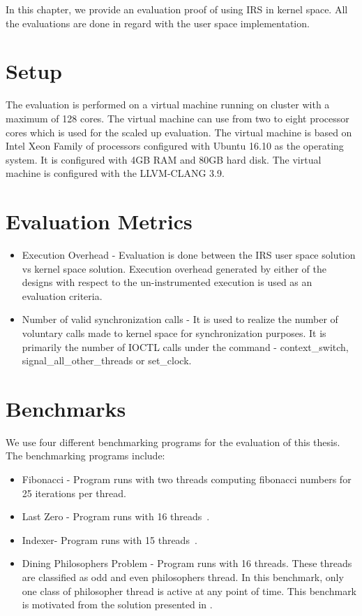 In this chapter, we provide an evaluation proof of using IRS in kernel space. 
All the evaluations are done in regard with the user space implementation. 

\section{Setup}

The evaluation is performed on a virtual machine running on cluster with a maximum of 128 cores. 
The virtual machine can use from two to eight processor cores which is used for the scaled up evaluation. 
The virtual machine is based on Intel Xeon Family of processors configured with Ubuntu 16.10 as the operating system. 
It is configured with 4GB RAM and 80GB hard disk. 
The virtual machine is configured with the LLVM-CLANG 3.9.


\section{Evaluation Metrics}

\begin{itemize}
\item{Execution Overhead} - Evaluation is done between the IRS user space solution vs kernel space solution. 
Execution overhead generated by either of the designs with respect to the un-instrumented execution is used as an evaluation criteria.
\item{Number of valid synchronization calls} - It is used to realize the number of voluntary calls made to kernel space for synchronization purposes. 
It is primarily the number of IOCTL calls under the command - context\_switch, signal\_all\_other\_threads or set\_clock.
\end{itemize}


\section{Benchmarks}

We use four different benchmarking programs for the evaluation of this thesis. 
The benchmarking programs include:
\begin{itemize}
\item{Fibonacci} - Program runs with two threads computing fibonacci numbers for 25 iterations per thread.
\item{Last Zero} - Program runs with 16 threads~\citep{abdulla2014optimal}.
\item{Indexer}- Program runs with 15 threads~\citep{dynamic_por}.
\item{Dining Philosophers Problem} - Program runs with 16 threads. These threads are classified as odd and even philosophers thread. 
In this benchmark, only one class of philosopher thread is active at any point of time. 
This benchmark is motivated from the solution presented in \citet{silberschatz2014operating}.
\end{itemize}

